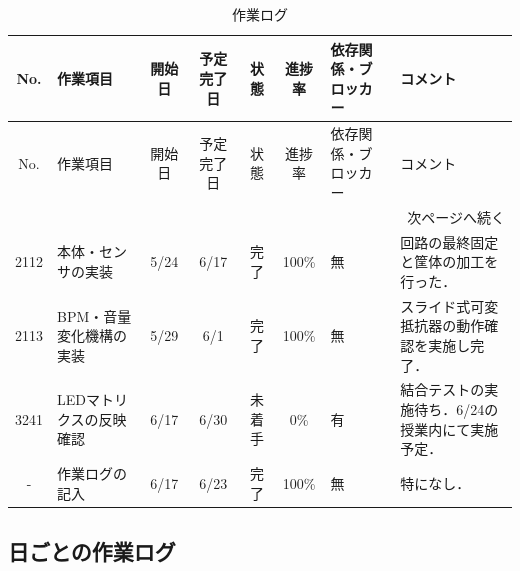 \documentclass[uplatex,dvipdfmx,a4paper,11pt]{jsarticle}
\begin{document}
\begin{longtable}{|c|p{2.2cm}|c|c|c|c|p{2.4cm}|p{3.1cm}|}
\caption{作業ログ} \\
\hline
No. & 作業項目 & 開始日 & 予定完了日 & 状態 & 進捗率 & 依存関係・ブロッカー & コメント \\
\hline
\endfirsthead

\hline
No. & 作業項目 & 開始日 & 予定完了日 & 状態 & 進捗率 & 依存関係・ブロッカー & コメント \\
\hline
\endhead

\hline
\multicolumn{8}{r}{次ページへ続く} \\
\hline
\endfoot

\hline
\endlastfoot

2112 &
本体・センサの実装 &
5/24 &
6/17 &
完了 &
100\% &
無 &
回路の最終固定と筐体の加工を行った．\\
\hline



2113 &
BPM・音量変化機構の実装 &
5/29 &
6/1 &
完了 &
100\% &
無 &
スライド式可変抵抗器の動作確認を実施し完了．\\
\hline

3241 &
LEDマトリクスの反映確認 &
6/17 &
6/30 &
未着手 &
0\% &
有 & 
結合テストの実施待ち．6/24の授業内にて実施予定．\\
\hline

- &
作業ログの記入 &
6/17 &
6/23 &
完了 &
100\% &
無 &
特になし．\\
\hline



\end{longtable}


\subsection{日ごとの作業ログ}


    \renewcommand{\arraystretch}{1.2}

    \small
\end{document}
